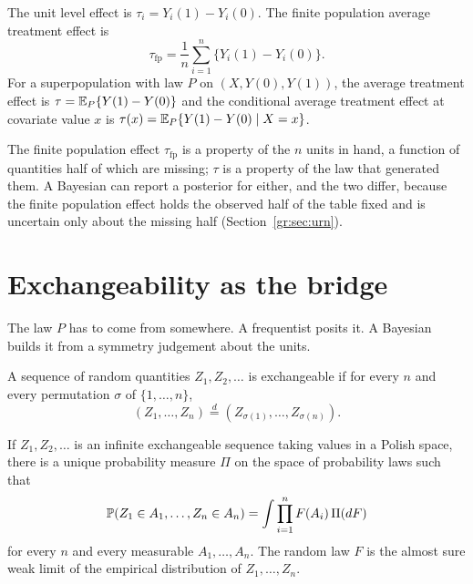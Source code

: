 \begin{definition}
The unit level effect is $\tau_i = Y_i(1) - Y_i(0)$. The finite population average treatment effect is
\[
\tau_{\mathrm{fp}} = \frac{1}{n}\sum_{i=1}^n \{Y_i(1) - Y_i(0)\}.
\]
For a superpopulation with law $P$ on $(X, Y(0), Y(1))$, the average treatment effect is $\tau = \mathbb{E}_P\{Y(1) - Y(0)\}$ and the conditional average treatment effect at covariate value $x$ is $\tau(x) = \mathbb{E}_P\{Y(1) - Y(0) \mid X = x\}$.
\end{definition}

The finite population effect $\tau_{\mathrm{fp}}$ is a property of the $n$ units in hand, a function of quantities half of which are missing; $\tau$ is a property of the law that generated them. A Bayesian can report a posterior for either, and the two differ, because the finite population effect holds the observed half of the table fixed and is uncertain only about the missing half (Section~\ref{gr:sec:urn}).

\section{Exchangeability as the bridge}\label{sec:exchangeability}

The law $P$ has to come from somewhere. A frequentist posits it. A Bayesian builds it from a symmetry judgement about the units.

\begin{definition}[Exchangeability]
A sequence of random quantities $Z_1, Z_2, \ldots$ is exchangeable if for every $n$ and every permutation $\sigma$ of $\{1, \ldots, n\}$,
\[
(Z_1, \ldots, Z_n) \overset{d}{=} (Z_{\sigma(1)}, \ldots, Z_{\sigma(n)}).
\]
\end{definition}

\begin{theorem}[de Finetti]
If $Z_1, Z_2, \ldots$ is an infinite exchangeable sequence taking values in a Polish space, there is a unique probability measure $\Pi$ on the space of probability laws such that
\[
\mathbb{P}(Z_1 \in A_1, \ldots, Z_n \in A_n) = \int \prod_{i=1}^n F(A_i) \, \Pi(dF)
\]
for every $n$ and every measurable $A_1, \ldots, A_n$. The random law $F$ is the almost sure weak limit of the empirical distribution of $Z_1, \ldots, Z_n$.
\end{theorem}

